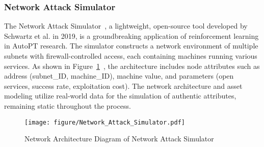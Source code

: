 


\subsubsection{Network Attack Simulator}


The Network Attack Simulator~\cite{schwartz2019autonomous}, a lightweight, open-source tool developed by Schwartz et al. in 2019, is a groundbreaking application of reinforcement learning in AutoPT research.
The simulator constructs a network environment of multiple subnets with firewall-controlled access, each containing machines running various services. As shown in Figure~\ref{Network Attack Simulator}~\cite{schwartz2019autonomous}, the architecture includes node attributes such as address (subnet\_ID, machine\_ID), machine value, and parameters (open services, success rate, exploitation cost).
The network architecture and asset modeling utilize real-world data for the simulation of authentic attributes, remaining static throughout the process.

\begin{figure}[tb]
\centering
\texttt{[image: figure/Network\_Attack\_Simulator.pdf]}
\caption{Network Architecture Diagram of Network Attack Simulator~\cite{schwartz2019autonomous}}
\label{Network Attack Simulator}
\end{figure}

